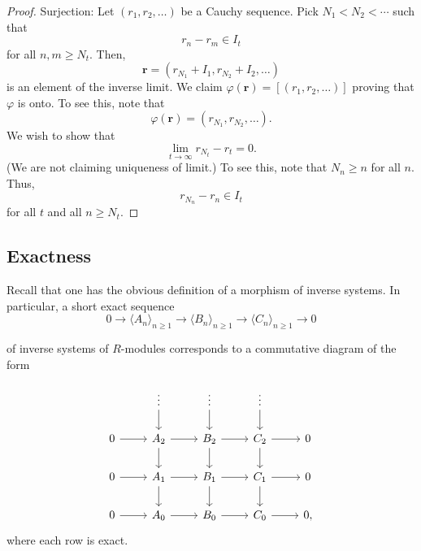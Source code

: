 \documentclass[12pt]{article}
\begin{document}
\begin{proof}
	Surjection: Let $(r_{1}, r_{2}, \ldots)$ be a Cauchy sequence. \newline
	Pick $N_{1} < N_{2} < \cdots$ such that 
	\begin{equation*} 
		r_{n} - r_{m} \in I_{t}
	\end{equation*}
	for all $n, m \ge N_{t}$. \newline
	Then, 
	\begin{equation*} 
		\mathbf{r} = (r_{N_{1}} + I_{1}, r_{N_{2}} + I_{2}, \ldots)
	\end{equation*}
	is an element of the inverse limit. \newline
	We claim $\varphi(\mathbf{r}) = [(r_{1}, r_{2}, \ldots)]$ proving that $\varphi$ is onto. \newline
	To see this, note that
	\begin{equation*} 
		\varphi(\mathbf{r}) = (r_{N_{1}}, r_{N_{2}}, \ldots).
	\end{equation*}
	We wish to show that
	\begin{equation*} 
		\lim_{t \to \infty} r_{N_{t}} - r_{t} = 0.
	\end{equation*}
	(We are not claiming uniqueness of limit.) \newline
	To see this, note that $N_{n} \ge n$ for all $n$. Thus,
	\begin{equation*} 
		r_{N_{n}} - r_{n} \in I_{t}
	\end{equation*}
	for all $t$ and all $n \ge N_{t}$.
\end{proof}

\subsection{Exactness}

Recall that one has the obvious definition of a morphism of inverse systems. In particular, a short exact sequence 
\begin{equation*} 
	0 \to \langle A_{n} \rangle_{n \ge 1} \to \langle B_{n} \rangle_{n \ge 1} \to \langle C_{n} \rangle_{n \ge 1} \to 0
\end{equation*} 

of inverse systems of $R$-modules corresponds to a commutative diagram of the form

\begin{equation*} 
	\begin{tikzcd}
		& \vdots \arrow[d] & \vdots \arrow[d] & \vdots \arrow[d] & \\
		0 \arrow[r] & A_{2} \arrow[d] \arrow[r] & B_{2} \arrow[d] \arrow[r] & C_{2} \arrow[d] \arrow[r] & 0 \\
		0 \arrow[r] & A_{1} \arrow[d] \arrow[r] & B_{1} \arrow[d] \arrow[r] & C_{1} \arrow[d] \arrow[r] & 0 \\
		0 \arrow[r] & A_{0} \arrow[r] & B_{0} \arrow[r] & C_{0} \arrow[r] & 0, 
	\end{tikzcd}
\end{equation*}
where each row is exact.
\end{document}
